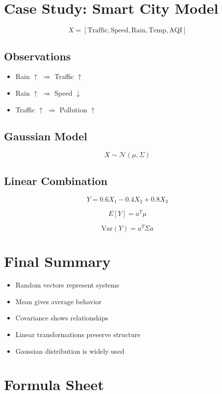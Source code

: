 \documentclass[12pt,a4paper]{article}
\begin{document}
\section{Case Study: Smart City Model}

\[
X = [\text{Traffic}, \text{Speed}, \text{Rain}, \text{Temp}, \text{AQI}]
\]

\subsection{Observations}
\begin{itemize}
\item Rain $\uparrow$ $\Rightarrow$ Traffic $\uparrow$
\item Rain $\uparrow$ $\Rightarrow$ Speed $\downarrow$
\item Traffic $\uparrow$ $\Rightarrow$ Pollution $\uparrow$
\end{itemize}

\subsection{Gaussian Model}

\[
X \sim \mathcal{N}(\mu, \Sigma)
\]

\subsection{Linear Combination}

\[
Y = 0.6X_1 - 0.4X_2 + 0.8X_3
\]

\[
E[Y] = a^T \mu
\]

\[
\text{Var}(Y) = a^T \Sigma a
\]

\section{Final Summary}

\begin{itemize}
\item Random vectors represent systems
\item Mean gives average behavior
\item Covariance shows relationships
\item Linear transformations preserve structure
\item Gaussian distribution is widely used
\end{itemize}

\section{Formula Sheet}
\end{document}
